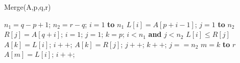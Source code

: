 \documentclass[review, authoryear, 3p, 12pt]{elsarticle}
\begin{document}
	\begin{algorithm}[htbp]
		\caption{Merge(A,p,q,r)}
		\label{alg:tsh}
		\begin{codebox}
			\li 	$n_1=q-p+1$;
			\li 	$n_2=r-q$;
			\li 	{}
			\li 	\For $i=1$ \textbf{to} $n_1$
					\Do
			\li 		$L[i] = A[p+i-1]$;
						\End
			\li 	\For $j=1$ \textbf{to} $n_2$
					\Do
			\li 		$R[j] = A[q+i]$;
					\End
			\li 	$i=1$;
			\li 	$j=1$;
			\li 	$k=p$;
			\li 	\While $i < n_1$ \textbf{and} $j < n_2$
					\Do
			\li 		\If $L[i] \leq R[j]$
						\Do
			\li 			$A[k]=L[i]$;
			\li 			$i++$;
			\li			\Else
			\li 			$A[k]=R[j]$;
			\li 			$j++$;
						\End
			\li			$k++$;
					\End
			\li 	\If $j==n_2$
					\Do
			\li 		\For $m=k$ \textbf{to} $r$
							\Do
			\li 				$A[m] = L[i]$;
			\li 				$i++$;
						\End
					\End
		\end{codebox}
	\end{algorithm}
\end{document}
